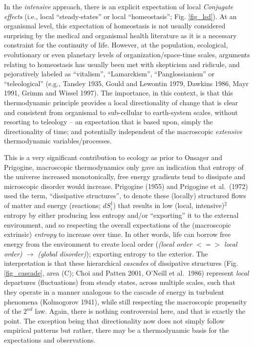 \documentclass[11pt,letterpaper,]{paper}
\begin{document}
In the \emph{intensive} approach, there is an explicit expectation of
local \emph{Conjugate effects} (i.e., local ``steady-states'' or local
``homeostasis''; Fig. \ref{fig_lsd}). At an organismal level, this
expectation of homeostasis is not usually considered surprising by the
medical and organismal health literature as it is a necessary constraint
for the continuity of life. However, at the population, ecological,
evolutionary or even planetary levels of organization/space-time scales,
arguments relating to homeostasis has usually been met with skepticism
and ridicule, and pejoratively labeled as ``vitalism'', ``Lamarckism'',
``Panglossianism'' or ``teleological'' (e.g., Tansley 1935, Gould and
Lewontin 1979, Dawkins 1986, Mayr 1991, Grimm and Wissel 1997). The
importance, in this context, is that this thermodynamic principle
provides a local directionality of change that is clear and consistent
from organismal to sub-cellular to earth-system scales, without
resorting to teleology -- an expectation that is based upon, simply the
directionality of time; and potentially independent of the macroscopic
\emph{extensive} thermodynamic variables/processes.

This is a very significant contribution to ecology as prior to Onsager
and Prigogine, macroscopic thermodynamics only gave an indication that
entropy of the universe increased monotonically, free energy gradients
tend to dissipate and microscopic disorder would increase. Prigogine
(1955) and Prigogine et al.~(1972) used the term, ``dissipative
structures'', to denote these (locally) structured flows of matter and
energy (reactions; \(dS^\ddagger_i\)) that results in low (local,
intensive)\(^2\) entropy by either producing less entropy and/or
``exporting'' it to the external environment, and so respecting the
overall expectations of the (macroscopic extrinsic) \emph{entropy} to
increase over time. In other words, life can borrow free energy from the
environment to create local order (\emph{(local order \(<=>\) local
order) \(\rightarrow\) (global disorder)}); exporting entropy to the
exterior. The interpretation is that these hierarchical \emph{cascades}
of dissipative structures (Fig. \ref{fig_cascade}, area (C); Choi and
Patten 2001, O'Neill et al.~1986) represent \emph{local} departures
(fluctuations) from steady states, across multiple scales, such that
they operate in a manner analogous to the cascade of energy in turbulent
phenomena (Kolmogorov 1941), while still respecting the macroscopic
propensity of the \(2^{nd}\) law. Again, there is nothing controversial
here, and that is exactly the point. The exception being that
directionality now does not simply follow empirical patterns but rather,
there may be a thermodynamic basis for the expectations and
observations.
\end{document}
